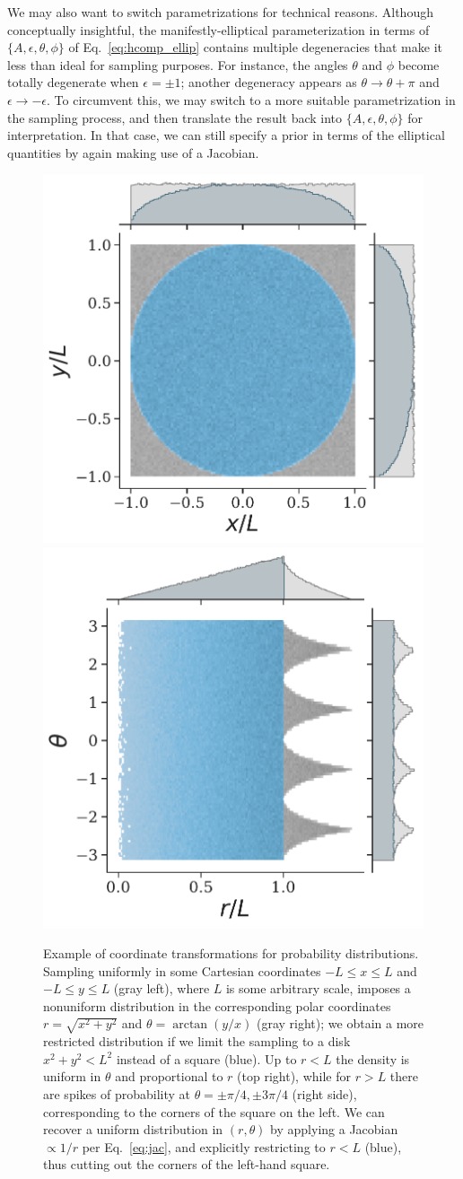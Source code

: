 \documentclass[aps,prd,twocolumn,superscriptaddress,preprintnumbers,floatfix,nofootinbib]{revtex4-2}
\newcommand*{\eq}[1]{Eq.~\eqref{eq:#1}}
\begin{document}
We may also want to switch parametrizations for technical reasons.
Although conceptually insightful, the manifestly-elliptical parameterization in terms of $\{A, \epsilon, \theta, \phi\}$ of \eq{hcomp_ellip} contains multiple degeneracies that make it less than ideal for sampling purposes.
For instance, the angles $\theta$ and $\phi$ become totally degenerate when $\epsilon = \pm 1$; another degeneracy appears as $\theta \to \theta + \pi$ and $\epsilon \to - \epsilon$.
To circumvent this, we may switch to a more suitable parametrization in the sampling process, and then translate the result back into $\{A, \epsilon, \theta, \phi\}$ for interpretation.
In that case, we can still specify a prior in terms of the elliptical quantities by again making use of a Jacobian.

\begin{figure}
\includegraphics[width=0.49\columnwidth]{jac_example_0}
\includegraphics[width=0.49\columnwidth]{jac_example_1}
\caption{Example of coordinate transformations for probability distributions.
Sampling uniformly in some Cartesian coordinates $-L \leq x \leq L$ and $-L \leq y \leq L$ (gray left), where $L$ is some arbitrary scale, imposes a nonuniform distribution in the corresponding polar coordinates $r = \sqrt{x^2 + y^2}$ and $\theta = \arctan(y/x)$ (gray right); we obtain a more restricted distribution if we limit the sampling to a disk $x^2 + y^2 < L^2$ instead of a square (blue). 
Up to $r < L$ the density is uniform in $\theta$ and proportional to $r$ (top right), while for $r>L$ there are spikes of probability at $\theta = \pm \pi/4,\pm 3\pi/4$ (right side), corresponding to the corners of the square on the left.
We can recover a uniform distribution in $(r, \theta)$ by applying a Jacobian $\propto 1/r$ per \eq{jac}, and explicitly restricting to $r< L$ (blue), thus cutting out the corners of the left-hand square.}
\label{fig:jac_example}
\end{figure}
\end{document}
